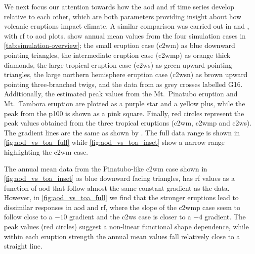 \documentclass{ametsocV5}
\begin{document}
We next focus our attention towards how the \ac{aod} and \ac{rf} time series develop
relative to each other, which are both parameters providing insight about how volcanic
eruptions impact climate. A similar comparison was carried out in \citet[][their Fig.\
  4]{gregory2016} and \citet[][their Fig.\ 1]{marshall2020}, with \ac{rf} to \ac{aod}
plots. \Cref{fig:aod_vs_toa_ses_avg} show annual mean values from the four simulation
cases in \cref{tab:simulation-overview}; the small eruption case (\ac{c2wm}) as blue
downward pointing triangles, the intermediate eruption case (\ac{c2wmp}) as orange thick
diamonds, the large tropical eruption case (\ac{c2ws}) as green upward pointing
triangles, the large northern hemisphere eruption case (\ac{c2wsn}) as brown upward
pointing three-branched twigs, and the data from \citet[][Fig.\ 4, black crosses from
  HadCM3 sstPiHistVol]{gregory2016} as grey crosses labelled G16. Additionally, the
estimated peak values from the Mt.\ Pinatubo eruption and Mt.\ Tambora eruption are
plotted as a purple star and a yellow plus, while the peak from the \ac{p100} is shown
as a pink square. Finally, red circles represent the peak values obtained from the three
tropical eruptions (\ac{c2wm}, \ac{c2wmp} and \ac{c2ws}). The gradient lines are the
same as shown by \citet{gregory2016}. The full data range is shown in
\cref{fig:aod_vs_toa_full} while \cref{fig:aod_vs_toa_inset} show a narrow range
highlighting the \ac{c2wm} case.

The annual mean data from the Pinatubo-like \ac{c2wm} case shown in
\cref{fig:aod_vs_toa_inset} as blue downward facing triangles, has \ac{rf} values as a
function of \ac{aod} that follow almost the same constant gradient as the
\citet{gregory2016} data. However, in \cref{fig:aod_vs_toa_full} we find that the
stronger eruptions lead to dissimilar responses in \ac{aod} and \ac{rf}, where the slope
of the \ac{c2wmp} case seem to follow close to a \(-10\) gradient and the \ac{c2ws} case
is closer to a \(-4\) gradient. The peak values (red circles) suggest a non-linear
functional shape dependence, while within each eruption strength the annual mean values
fall relatively close to a straight line.
\end{document}

